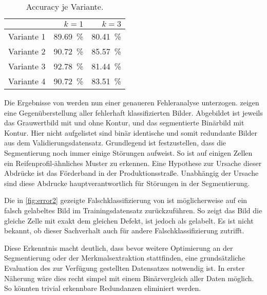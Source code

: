 \begin{table}[htb]
    \centering
    \caption{\foreignlanguage{english}{Accuracy} je Variante.\label{tbl:accuracy}}
    \begin{tabular}{r r r}
        \toprule
                   & \(k = 1\)            & \(k = 3\)            \\
        \midrule
        Variante 1 & \SI{89.69}{\percent} & \SI{80.41}{\percent} \\
        Variante 2 & \SI{90.72}{\percent} & \SI{85.57}{\percent} \\
        Variante 3 & \SI{92.78}{\percent} & \SI{81.44}{\percent} \\
        Variante 4 & \SI{90.72}{\percent} & \SI{83.51}{\percent} \\
        \bottomrule
    \end{tabular}
\end{table}

Die Ergebnisse von  werden nun einer genaueren Fehleranalyse unterzogen.  zeigen eine Gegenüberstellung aller fehlerhaft klassifizierten Bilder. Abgebildet ist jeweils das Grauwertbild mit und ohne Kontur, und das segmentierte Binärbild mit Kontur. Hier nicht aufgelistet sind binär identische und somit redundante Bilder aus dem Validierungsdatensatz. Grundlegend ist festzustellen, dass die Segmentierung noch immer einige Störungen aufweist. So ist auf einigen Zellen ein Reifenprofil-ähnliches Muster zu erkennen. Eine Hypothese zur Ursache dieser Abdrücke ist das Förderband in der Produktionsstraße. Unabhängig der Ursache sind diese Abdrucke hauptverantwortlich für Störungen in der Segmentierung.

Die in \cref{fig:error2} gezeigte Falschklassifizierung von  ist möglicherweise auf ein falsch gelabeltes Bild im Trainingsdatensatz zurückzuführen. So zeigt das Bild  die gleiche Zelle mit exakt dem gleichen Defekt, ist jedoch als  gelabelt. Es ist nicht bekannt, ob dieser Sachverhalt auch für andere Falschklassifizierung zutrifft.

Diese Erkenntnis macht deutlich, dass bevor weitere Optimierung an der Segmentierung oder der Merkmalsextraktion stattfinden, eine grundsätzliche Evaluation des zur Verfügung gestellten Datensatzes notwendig ist. In erster Näherung wäre dies recht simpel mit einem Binärvergleich aller Daten möglich. So könnten trivial erkennbare Redundanzen eliminiert werden.


